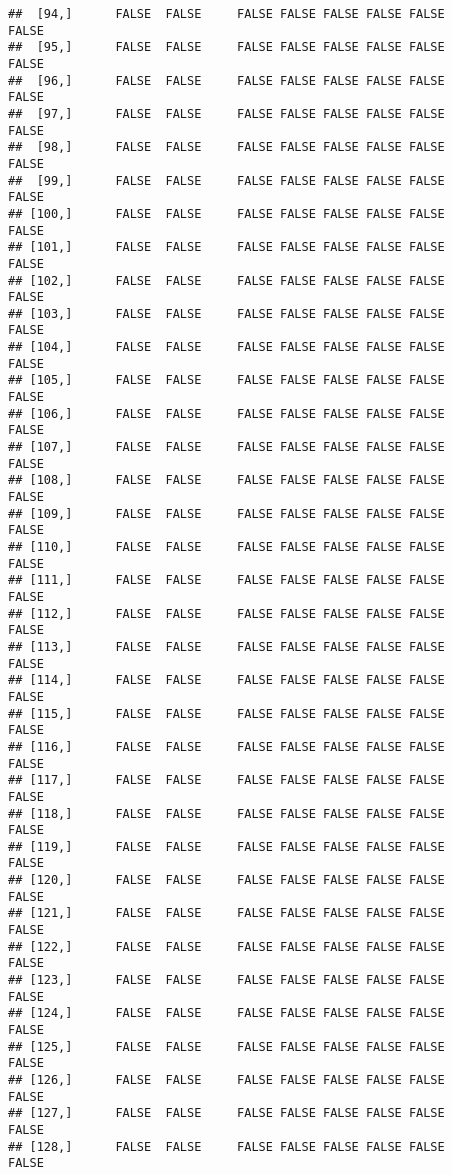 \documentclass[
]{article}
\begin{document}
\begin{verbatim}
##  [94,]      FALSE  FALSE     FALSE FALSE FALSE FALSE FALSE         FALSE
##  [95,]      FALSE  FALSE     FALSE FALSE FALSE FALSE FALSE         FALSE
##  [96,]      FALSE  FALSE     FALSE FALSE FALSE FALSE FALSE         FALSE
##  [97,]      FALSE  FALSE     FALSE FALSE FALSE FALSE FALSE         FALSE
##  [98,]      FALSE  FALSE     FALSE FALSE FALSE FALSE FALSE         FALSE
##  [99,]      FALSE  FALSE     FALSE FALSE FALSE FALSE FALSE         FALSE
## [100,]      FALSE  FALSE     FALSE FALSE FALSE FALSE FALSE         FALSE
## [101,]      FALSE  FALSE     FALSE FALSE FALSE FALSE FALSE         FALSE
## [102,]      FALSE  FALSE     FALSE FALSE FALSE FALSE FALSE         FALSE
## [103,]      FALSE  FALSE     FALSE FALSE FALSE FALSE FALSE         FALSE
## [104,]      FALSE  FALSE     FALSE FALSE FALSE FALSE FALSE         FALSE
## [105,]      FALSE  FALSE     FALSE FALSE FALSE FALSE FALSE         FALSE
## [106,]      FALSE  FALSE     FALSE FALSE FALSE FALSE FALSE         FALSE
## [107,]      FALSE  FALSE     FALSE FALSE FALSE FALSE FALSE         FALSE
## [108,]      FALSE  FALSE     FALSE FALSE FALSE FALSE FALSE         FALSE
## [109,]      FALSE  FALSE     FALSE FALSE FALSE FALSE FALSE         FALSE
## [110,]      FALSE  FALSE     FALSE FALSE FALSE FALSE FALSE         FALSE
## [111,]      FALSE  FALSE     FALSE FALSE FALSE FALSE FALSE         FALSE
## [112,]      FALSE  FALSE     FALSE FALSE FALSE FALSE FALSE         FALSE
## [113,]      FALSE  FALSE     FALSE FALSE FALSE FALSE FALSE         FALSE
## [114,]      FALSE  FALSE     FALSE FALSE FALSE FALSE FALSE         FALSE
## [115,]      FALSE  FALSE     FALSE FALSE FALSE FALSE FALSE         FALSE
## [116,]      FALSE  FALSE     FALSE FALSE FALSE FALSE FALSE         FALSE
## [117,]      FALSE  FALSE     FALSE FALSE FALSE FALSE FALSE         FALSE
## [118,]      FALSE  FALSE     FALSE FALSE FALSE FALSE FALSE         FALSE
## [119,]      FALSE  FALSE     FALSE FALSE FALSE FALSE FALSE         FALSE
## [120,]      FALSE  FALSE     FALSE FALSE FALSE FALSE FALSE         FALSE
## [121,]      FALSE  FALSE     FALSE FALSE FALSE FALSE FALSE         FALSE
## [122,]      FALSE  FALSE     FALSE FALSE FALSE FALSE FALSE         FALSE
## [123,]      FALSE  FALSE     FALSE FALSE FALSE FALSE FALSE         FALSE
## [124,]      FALSE  FALSE     FALSE FALSE FALSE FALSE FALSE         FALSE
## [125,]      FALSE  FALSE     FALSE FALSE FALSE FALSE FALSE         FALSE
## [126,]      FALSE  FALSE     FALSE FALSE FALSE FALSE FALSE         FALSE
## [127,]      FALSE  FALSE     FALSE FALSE FALSE FALSE FALSE         FALSE
## [128,]      FALSE  FALSE     FALSE FALSE FALSE FALSE FALSE         FALSE

\end{verbatim}
\end{document}
